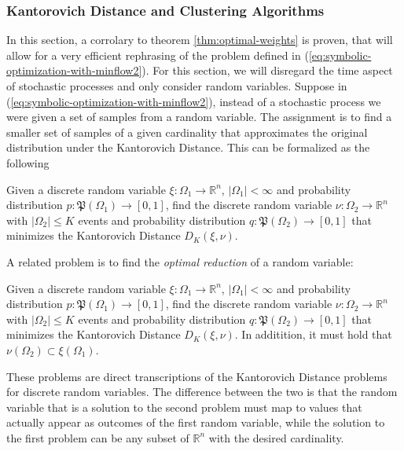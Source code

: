 \subsubsection{Kantorovich Distance and Clustering Algorithms}
In this section, a corrolary to theorem \ref{thm:optimal-weights} is proven, that will allow for a very efficient rephrasing of the problem defined in (\ref{eq:symbolic-optimization-with-minflow2}).
For this section, we will disregard the time aspect of stochastic processes and only consider random variables.
Suppose in (\ref{eq:symbolic-optimization-with-minflow2}), instead of a stochastic process we were given a set of samples from a random variable.
The assignment is to find a smaller set of samples of a given cardinality that approximates the original distribution under the Kantorovich Distance.
This can be formalized as the following
\begin{problem}
\label{prb:CE-Kantorovich-randvar}
  Given a discrete random variable $\xi :\Omega_1\rightarrow \mathbb{R}^n$, $|\Omega_1|<\infty$ and probability distribution $p:\mathfrak{P}(\Omega_1)\rightarrow [0,1]$, find the discrete random variable $\nu : \Omega_2\rightarrow\mathbb{R}^n$ with $|\Omega_2 | \leq K$ events and probability distribution $q:\mathfrak{P}(\Omega_2)\rightarrow [0,1]$ that minimizes the Kantorovich Distance $D_K(\xi,\nu)$.
\end{problem}
A related problem is to find the \textit{optimal reduction} of a random variable:
\begin{problem}
  \label{prb:DE-Kantorovich-randvar}
  Given a discrete random variable $\xi : \Omega_1\rightarrow \mathbb{R}^n$, $|\Omega_1|<\infty$ and probability distribution $p:\mathfrak{P}(\Omega_1)\rightarrow [0,1]$, find the discrete random variable $\nu : \Omega_2\rightarrow\mathbb{R}^n$ with $|\Omega_2 | \leq K$ events and probability distribution $q:\mathfrak{P}(\Omega_2)\rightarrow [0,1]$ that minimizes the Kantorovich Distance $D_K(\xi,\nu)$.
  In additition, it must hold that $\nu(\Omega_2)\subset\xi(\Omega_1)$.
\end{problem}
These problems are direct transcriptions of the Kantorovich Distance problems for discrete random variables.
The difference between the two is that the random variable that is a solution to the second problem must map to values that actually appear as outcomes of the first random variable,
while the solution to the first problem can be any subset of $\mathbb{R}^n$ with the desired cardinality.


